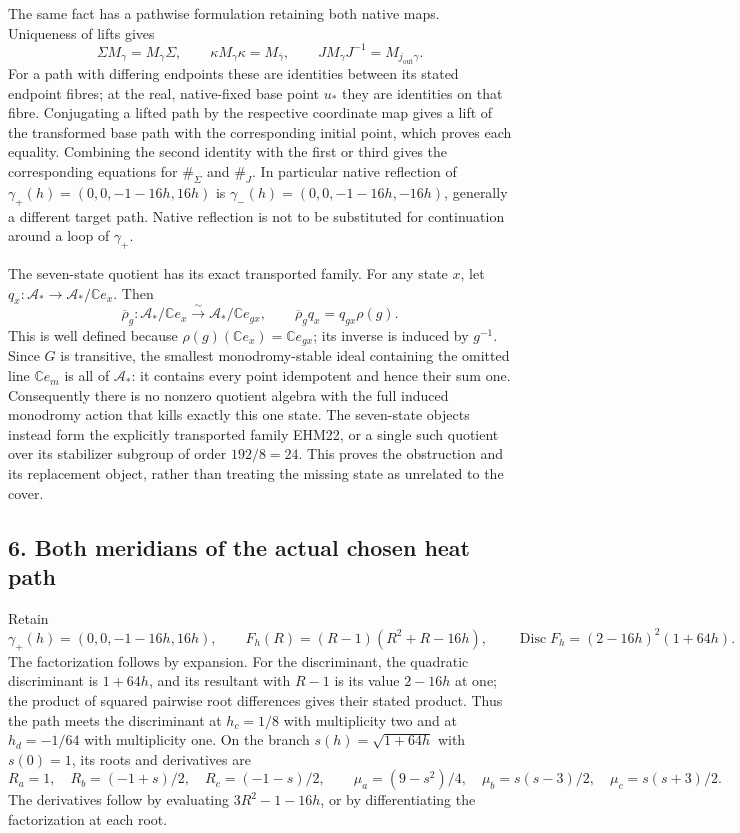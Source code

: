 \documentclass[
  10pt,
  a4paper,
]{article}
\begin{document}
The same fact has a pathwise formulation retaining both native maps.
Uniqueness of lifts gives \[
\Sigma M_\gamma=M_\gamma\Sigma,\qquad
\kappa M_\gamma\kappa=M_{\overline\gamma},\qquad
J M_\gamma J^{-1}=M_{j_{\mathrm{out}}\gamma}.
\tag{EHM21}
\] For a path with differing endpoints these are identities between its
stated endpoint fibres; at the real, native-fixed base point \(u_*\)
they are identities on that fibre. Conjugating a lifted path by the
respective coordinate map gives a lift of the transformed base path with
the corresponding initial point, which proves each equality. Combining
the second identity with the first or third gives the corresponding
equations for \(\#_\Sigma\) and \(\#_J\). In particular native
reflection of \(\gamma_+(h)=(0,0,-1-16h,16h)\) is
\(\gamma_-(h)=(0,0,-1-16h,-16h)\), generally a different target path.
Native reflection is not to be substituted for continuation around a
loop of \(\gamma_+\).

The seven-state quotient has its exact transported family. For any state
\(x\), let \(q_x:\mathcal A_*\to\mathcal A_*/\mathbb Ce_x\). Then \[
\overline\rho_g:\mathcal A_*/\mathbb Ce_x\xrightarrow{\sim}
\mathcal A_*/\mathbb Ce_{gx},\qquad
\overline\rho_g q_x=q_{gx}\rho(g).
\tag{EHM22}
\] This is well defined because
\(\rho(g)(\mathbb Ce_x)=\mathbb Ce_{gx}\); its inverse is induced by
\(g^{-1}\). Since \(G\) is transitive, the smallest monodromy-stable
ideal containing the omitted line \(\mathbb Ce_m\) is all of
\(\mathcal A_*\): it contains every point idempotent and hence their sum
one. Consequently there is no nonzero quotient algebra with the full
induced monodromy action that kills exactly this one state. The
seven-state objects instead form the explicitly transported family
EHM22, or a single such quotient over its stabilizer subgroup of order
\(192/8=24\). This proves the obstruction and its replacement object,
rather than treating the missing state as unrelated to the cover.

\subsection{6. Both meridians of the actual chosen heat
path}\label{both-meridians-of-the-actual-chosen-heat-path}

Retain \[
\gamma_+(h)=(0,0,-1-16h,16h),\qquad
F_h(R)=(R-1)(R^2+R-16h),\qquad
\operatorname{Disc}F_h=(2-16h)^2(1+64h).
\tag{EHM23}
\] The factorization follows by expansion. For the discriminant, the
quadratic discriminant is \(1+64h\), and its resultant with \(R-1\) is
its value \(2-16h\) at one; the product of squared pairwise root
differences gives their stated product. Thus the path meets the
discriminant at \(h_c=1/8\) with multiplicity two and at \(h_d=-1/64\)
with multiplicity one. On the branch \(s(h)=\sqrt{1+64h}\) with
\(s(0)=1\), its roots and derivatives are \[
R_a=1,\quad R_b=(-1+s)/2,\quad R_c=(-1-s)/2,
\qquad
\mu_a=(9-s^2)/4,\quad\mu_b=s(s-3)/2,\quad\mu_c=s(s+3)/2.
\tag{EHM24}
\] The derivatives follow by evaluating \(3R^2-1-16h\), or by
differentiating the factorization at each root.
\end{document}
